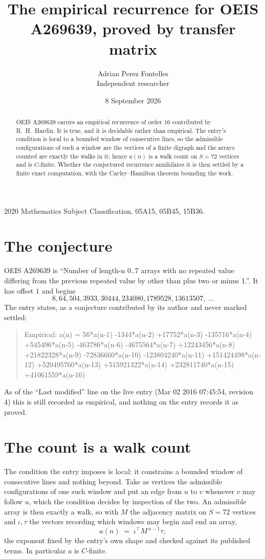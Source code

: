 \documentclass[11pt,a4paper]{article}
\title{The empirical recurrence for OEIS A269639, proved by transfer matrix}
\author{Adrian Perez Fontelles\\ \small Independent researcher}
\date{8 September 2026}
\theoremstyle{plain}
\theoremstyle{definition}
\begin{document}
\maketitle

\begin{abstract}
OEIS A269639 carries an empirical recurrence of order $16$ contributed by R.~H.~Hardin. It is
true, and it is decidable rather than empirical. The entry's condition is local to a bounded window of consecutive lines, so
the admissible configurations of such a window are the vertices of a finite digraph and the
arrays counted are exactly the walks in it; hence $a(n)$ is a walk count on $S=72$ vertices
and is $C$-finite. Whether the conjectured recurrence annihilates it is then settled by a
finite exact computation, with the Cayley--Hamilton theorem bounding the work.
\end{abstract}

\noindent\small 2020 Mathematics Subject Classification. 05A15, 05B45, 15B36.\normalsize

\section{The conjecture}

OEIS A269639 is ``Number of length-n 0..7 arrays with no repeated value differing from the previous repeated value by other than plus two or minus 1.''. It has offset $1$ and begins
\[
8, 64, 504, 3933, 30444, 234080, 1789528, 13613507,\ \dots
\]
The entry states, as a conjecture contributed by its author and never marked settled:
\begin{quote}
Empirical: a(n) = 56*a(n-1) -1344*a(n-2) +17752*a(n-3) -135716*a(n-4) +545496*a(n-5) -463786*a(n-6) -4675564*a(n-7) +12243456*a(n-8) +21822328*a(n-9) -72836660*a(n-10) -123804240*a(n-11) +151424498*a(n-12) +520495760*a(n-13) +515921322*a(n-14) +232811740*a(n-15) +41061559*a(n-16)
\end{quote}
As of the ``Last modified'' line on the live entry (Mar 02 2016 07:45:54, revision 4) this is still
recorded as empirical, and nothing on the entry records it as proved.

\section{The count is a walk count}

The condition the entry imposes is local: it constrains a bounded window of consecutive lines and nothing beyond. Take as
vertices the admissible configurations of one such window and put an edge from $u$ to $v$
whenever $v$ may follow $u$, which the condition decides by inspection of the two. An
admissible array is then exactly a walk, so with $M$ the adjacency matrix on $S=72$ vertices
and $\iota,\tau$ the vectors recording which windows may begin and end an array,
\[
a(n)\;=\;\iota^{\!\top}M^{\,n-1}\tau ,
\]
the exponent fixed by the entry's own shape and checked against its published terms. In
particular $a$ is $C$-finite.
\end{document}
